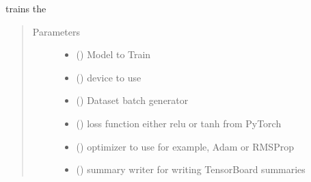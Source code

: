 \documentclass[letterpaper,10pt,english,openany,oneside]{sphinxmanual}
\begin{document}
\begin{fulllineitems}
\label{\detokenize{docs/source/train:train.train_model.train}}
trains the 
\begin{quote}\begin{description}
\item[{Parameters}] \leavevmode\begin{itemize}
\item {} 
 ({\hyperref[\detokenize{docs/source/train:train.model.Generalised_Recurrent_Model}]{}}) \textendash{} Model to Train

\item {} 
 () \textendash{} device to use

\item {} 
 () \textendash{} Dataset batch generator

\item {} 
 () \textendash{} loss function either relu or tanh from PyTorch

\item {} 
 () \textendash{} optimizer to use for example, Adam or RMSProp

\item {} 
 () \textendash{} summary writer for writing TensorBoard summaries

\end{itemize}

\end{description}\end{quote}

\end{fulllineitems}
\end{document}
